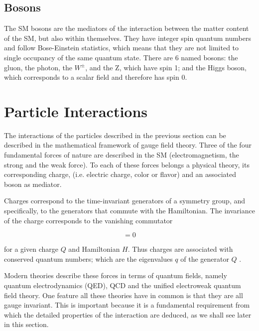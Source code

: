 



\subsection{Bosons}
The SM bosons are the mediators of the interaction between the matter content of the SM, but also within themselves. They have integer spin quantum numbers and follow Bose-Einstein statistics, which means that they are not limited to single occupancy of the same quantum state. There are 6 named bosons: the gluon, the photon, the $W^{\pm}$, and the Z, which have spin 1; and the Higgs boson, which corresponds to a scalar field and therefore has spin 0.

\section{Particle Interactions}
The interactions of the particles described in the previous section can be described in the mathematical framework of gauge field theory. Three of the four fundamental forces of nature are described in the SM (electromagnetism, the strong and the weak force). To each of these forces belongs a physical theory, its corresponding charge, (i.e. electric charge, color or flavor) and an associated boson as mediator. 

Charges correspond to the time-invariant generators of a symmetry group, and specifically, to the generators that commute with the Hamiltonian. The invariance of the charge corresponds to the vanishing commutator

\begin{equation}
[Q, H] = 0
\end{equation}

for a given charge $Q$ and Hamiltonian $H$. Thus charges are associated with conserved quantum numbers; which are the eigenvalues $q$ of the generator $Q$ \cite{wiki:charge}. 

Modern theories describe these forces in terms of quantum fields, namely quantum electrodynamics (QED), QCD and the unified electroweak quantum field theory. One feature all these theories have in common is that they are all gauge invariant. This is important because it is a fundamental requirement from which the detailed properties of the interaction are deduced, as we shall see later in this section.

